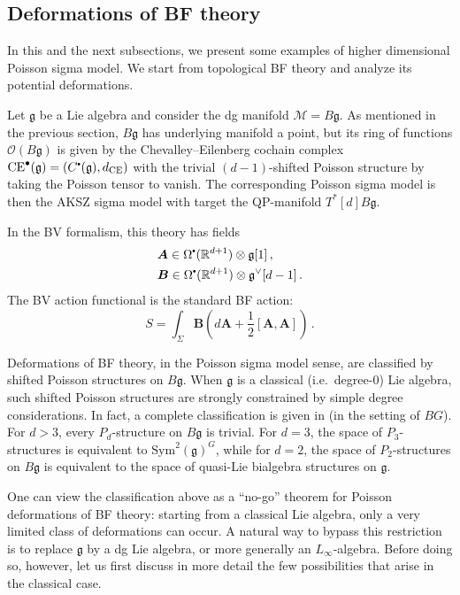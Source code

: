 \documentclass[11pt]{article}
\newcommand{\R}{\mathbb{R}}
\newcommand\sbullet[1][.5]{\mathbin{\vcenter{\hbox{\scalebox{#1}{$\bullet$}}}}}
\numberwithin{equation}{section}
\begin{document}
\subsection{Deformations of BF theory}
\label{sec:deformations-bf}
In this and the next subsections, we present some examples of higher dimensional Poisson sigma model. We start from topological BF theory and analyze its potential deformations. 

Let $\mathfrak{g}$ be a Lie algebra and consider the dg manifold $\mathcal{M}=B\mathfrak{g}$. As mentioned in the previous section, $B\mathfrak{g}$ has underlying manifold a point, but its ring of functions $\mathcal{O}(B\mathfrak{g})$ is given by the Chevalley--Eilenberg cochain complex $\mathrm{CE}^{\bullet}(\mathfrak{g}) = (C^{\sbullet}(\mathfrak{g}),d_{\mathrm{CE}})$ with the trivial $(d-1)$-shifted Poisson structure by taking the Poisson tensor to vanish. The corresponding Poisson sigma model is then the AKSZ sigma model with target the QP-manifold $T^*[d]B\mathfrak{g}$.

In the BV formalism, this theory has fields
\begin{equation}
\begin{aligned}
	&\boldsymbol{A} \in \Omega^{\sbullet}(\R^{d+1})\otimes \mathfrak{g}[1]\,,\\
	&\boldsymbol{B} \in \Omega^{\sbullet}(\R^{d+1})\otimes\mathfrak{g}^{\vee}[d-1]\,.
\end{aligned}
\end{equation}
The BV action functional is the standard BF action:
\begin{equation}
	S  = \int_{\Sigma}\boldsymbol{B}(d\boldsymbol{A} + \frac{1}{2}[\boldsymbol{A},\boldsymbol{A}])\,.
\end{equation}

Deformations of BF theory, in the Poisson sigma model sense, are classified by shifted Poisson structures on $B\mathfrak{g}$. When $\mathfrak{g}$ is a classical (i.e.\ degree-$0$) Lie algebra, such shifted Poisson structures are strongly constrained by simple degree considerations. In fact, a complete classification is given in \cite{safronov2023shifted} (in the setting of $BG$). For $d>3$, every $P_d$-structure on $B\mathfrak{g}$ is trivial. For $d=3$, the space of $P_3$-structures is equivalent to $\mathrm{Sym}^2(\mathfrak{g})^G$, while for $d=2$, the space of $P_2$-structures on $B\mathfrak{g}$ is equivalent to the space of quasi-Lie bialgebra structures on $\mathfrak{g}$.

One can view the classification above as a “no-go” theorem for Poisson deformations of BF theory: starting from a classical Lie algebra, only a very limited class of deformations can occur. A natural way to bypass this restriction is to replace $\mathfrak{g}$ by a dg Lie algebra, or more generally an $L_\infty$-algebra. Before doing so, however, let us first discuss in more detail the few possibilities that arise in the classical case.
\end{document}
